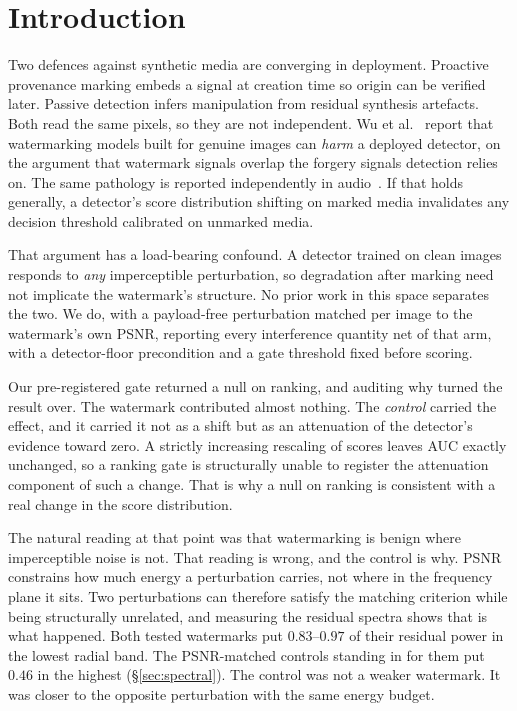 \documentclass[journal]{IEEEtran}
\begin{document}
\section{Introduction}

Two defences against synthetic media are converging in deployment. Proactive
provenance marking embeds a signal at creation time so origin can be verified
later. Passive detection infers manipulation from residual synthesis
artefacts. Both read the same pixels, so they are not independent. Wu et
al.~\cite{wu2024watermarksbugs} report that watermarking models built for
genuine images can \emph{harm} a deployed detector, on the argument that
watermark signals overlap the forgery signals detection relies on. The same
pathology is reported independently in audio~\cite{muller2026watermarkshortcut}.
If that holds generally, a detector's score distribution shifting on marked
media invalidates any decision threshold calibrated on unmarked media.

That argument has a load-bearing confound. A detector trained on clean images
responds to \emph{any} imperceptible perturbation, so degradation after
marking need not implicate the watermark's structure. No prior work in this
space separates the two. We do, with a payload-free perturbation matched per
image to the watermark's own PSNR, reporting every interference quantity net
of that arm, with a detector-floor precondition and a gate threshold fixed
before scoring.

Our pre-registered gate returned a null on ranking, and auditing why turned
the result over. The watermark contributed almost nothing. The
\emph{control} carried the effect, and it carried it not as a shift but as an
attenuation of the detector's evidence toward zero. A strictly increasing
rescaling of scores leaves AUC exactly unchanged, so a ranking gate is
structurally unable to register the attenuation component of such a change.
That is why a null on ranking is consistent with a real change in the score
distribution.

The natural reading at that point was that watermarking is benign where
imperceptible noise is not. That reading is wrong, and the control is why.
PSNR constrains how much energy a perturbation carries, not where in the
frequency plane it sits. Two perturbations can therefore satisfy the matching
criterion while being structurally unrelated, and measuring the residual
spectra shows that is what happened. Both tested watermarks put $0.83$--$0.97$
of their residual power in the lowest radial band. The PSNR-matched controls
standing in for them put $0.46$ in the highest (\S\ref{sec:spectral}). The
control was not a weaker watermark. It was closer to the opposite
perturbation with the same energy budget.
\end{document}
